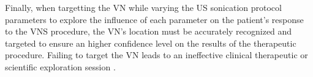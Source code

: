 Finally, when targetting the VN while varying the US sonication protocol
parameters to explore the influence of each parameter on the
patient's response to the VNS procedure, the VN's location must be
accurately recognized and targeted to ensure an higher confidence
level on the results of the therapeutic procedure. Failing to target
the VN leads to an ineffective clinical therapeutic or scientific
exploration session \cite{Ahmed2022}.
\par


